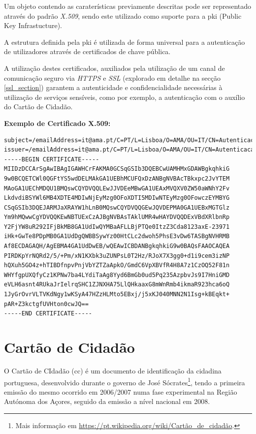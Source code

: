 Um objeto contendo as caraterísticas previamente descritas pode ser representado através do padrão \emph{X.509}, sendo este utilizado como suporte para a \gls{pki} (Public Key Infrastucture).

A estrutura definida pela \gls{pki} é utilizada de forma universal para a autenticação de utilizadores através de certificados de chave pública.\cite{pki}

A utilização destes certificados, auxiliados pela utilização de um canal de comunicação seguro via \emph{HTTPS} e \emph{SSL} (explorado em detalhe na secção \ref{ssl_section}) garantem a autenticidade e confidencialidade necessárias à utilização de serviços sensíveis, como por exemplo, a autenticação com o auxílio do Cartão de Cidadão.

\vspace{10mm}
\textbf{Exemplo de Certificado X.509:}
\begin{verbatim}
subject=/emailAddress=it@ama.pt/C=PT/L=Lisboa/O=AMA/OU=IT/CN=Autenticacao.Gov
issuer=/emailAddress=it@ama.pt/C=PT/L=Lisboa/O=AMA/OU=IT/CN=Autenticacao.Gov
-----BEGIN CERTIFICATE-----
MIIDzDCCArSgAwIBAgIGAWHCrFAKMA0GCSqGSIb3DQEBCwUAMHMxGDAWBgkqhkiG
9w0BCQETCWl0QGFtYS5wdDELMAkGA1UEBhMCUFQxDzANBgNVBAcTBkxpc2JvYTEM
MAoGA1UEChMDQU1BMQswCQYDVQQLEwJJVDEeMBwGA1UEAxMVQXV0ZW50aWNhY2Fv
LkdvdiBSYWl6MB4XDTE4MDIwNjEyMzg0OFoXDTI5MDIwNTEyMzg0OFowczEYMBYG
CSqGSIb3DQEJARMJaXRAYW1hLnB0MQswCQYDVQQGEwJQVDEPMA0GA1UEBxMGTGlz
Ym9hMQwwCgYDVQQKEwNBTUExCzAJBgNVBAsTAklUMR4wHAYDVQQDExVBdXRlbnRp
Y2FjYW8uR292IFjBkMB8GA1UdIwQYMBaAFLLBjPTQe0ItzZ3Cda8123axE-23971
iHk+GwTe8PDpMB0GA1UdDgQWBBSywYz00HtCLc2dwoh5PhsE3vDw6TASBgNVHRMB
Af8ECDAGAQH/AgEBMA4GA1UdDwEB/wQEAwICBDANBgkqhkiG9w0BAQsFAAOCAQEA
PIRDKpYrNQRd2/5/+Pm/xN1KXbk3uZUNPsL0T2Hz/RJoX7X3gg0+d1i9cem3izNP
hQXuh5GO4z+hTIBDfnpvPnjVbYZTZaApkO/GmdC6VpXBVfR4H8A7z1CzOQ52F81n
WHYfgpUXQfyCz1KPNw7ba4LYdiTaAg8Yyd6BmGb0ud5Pq235AzpbvJs9I7HniGMD
eVLH6asnt4RUkaJrIelrqSHC1ZJNXHA75LlQHkaaxG8mWnRmb4ikmaR923hca6oQ
1JyGrOvrVLTVKdNgy1wKSyA47HZzHLMto5EBxj/j5xKJ040MNN2N1Isg+kBEqkt+
pAR+Z3kctgfUVHton0cwJQ==
-----END CERTIFICATE-----
\end{verbatim}

\newpage
\section{Cartão de Cidadão}

O Cartão de CIdadão (\gls{cc}) é um documento de identificação da cidadina portuguesa, desenvolvido durante o governo de José Sócrates\footnote{Mais informação em \url{https://pt.wikipedia.org/wiki/Cartão_de_cidadão}.}, tendo a primeira emissão do mesmo ocorrido em 2006/2007 numa fase experimental na Região Autónoma dos Açores, seguido da emissão a nível nacional em 2008.

